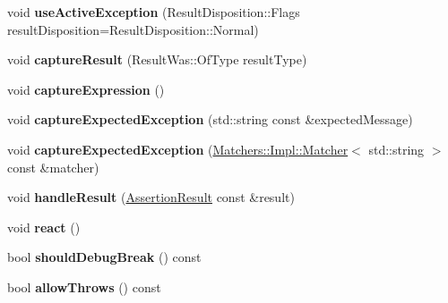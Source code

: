 \begin{DoxyCompactItemize}
\item 
void {\bfseries use\+Active\+Exception} (Result\+Disposition\+::\+Flags result\+Disposition=Result\+Disposition\+::\+Normal)\hypertarget{classCatch_1_1ResultBuilder_a5bbd2f14a678f3e8d0f791ac6d233d65}{}\label{classCatch_1_1ResultBuilder_a5bbd2f14a678f3e8d0f791ac6d233d65}

\item 
void {\bfseries capture\+Result} (Result\+Was\+::\+Of\+Type result\+Type)\hypertarget{classCatch_1_1ResultBuilder_a10e467f7b7a4976e5d148b4d5066e8fd}{}\label{classCatch_1_1ResultBuilder_a10e467f7b7a4976e5d148b4d5066e8fd}

\item 
void {\bfseries capture\+Expression} ()\hypertarget{classCatch_1_1ResultBuilder_af2ae2343965802eeeb0abbd4ea9d2d36}{}\label{classCatch_1_1ResultBuilder_af2ae2343965802eeeb0abbd4ea9d2d36}

\item 
void {\bfseries capture\+Expected\+Exception} (std\+::string const \&expected\+Message)\hypertarget{classCatch_1_1ResultBuilder_a9ac96f6220c8dd8e4feee725c6228d77}{}\label{classCatch_1_1ResultBuilder_a9ac96f6220c8dd8e4feee725c6228d77}

\item 
void {\bfseries capture\+Expected\+Exception} (\hyperlink{structCatch_1_1Matchers_1_1Impl_1_1Matcher}{Matchers\+::\+Impl\+::\+Matcher}$<$ std\+::string $>$ const \&matcher)\hypertarget{classCatch_1_1ResultBuilder_a7d443d632eaeabe2cb36218b8dcb7400}{}\label{classCatch_1_1ResultBuilder_a7d443d632eaeabe2cb36218b8dcb7400}

\item 
void {\bfseries handle\+Result} (\hyperlink{classCatch_1_1AssertionResult}{Assertion\+Result} const \&result)\hypertarget{classCatch_1_1ResultBuilder_ad8bb17e4ac590b75bf8630d8f3502f4e}{}\label{classCatch_1_1ResultBuilder_ad8bb17e4ac590b75bf8630d8f3502f4e}

\item 
void {\bfseries react} ()\hypertarget{classCatch_1_1ResultBuilder_a3085cdc46533d45bed6f652a2ac295c0}{}\label{classCatch_1_1ResultBuilder_a3085cdc46533d45bed6f652a2ac295c0}

\item 
bool {\bfseries should\+Debug\+Break} () const \hypertarget{classCatch_1_1ResultBuilder_a34cdbf7ad1e5b3cb4a94047f2d14bcb2}{}\label{classCatch_1_1ResultBuilder_a34cdbf7ad1e5b3cb4a94047f2d14bcb2}

\item 
bool {\bfseries allow\+Throws} () const \hypertarget{classCatch_1_1ResultBuilder_a3dbf18a3a4b00173dab052a8864e435e}{}\label{classCatch_1_1ResultBuilder_a3dbf18a3a4b00173dab052a8864e435e}

\end{DoxyCompactItemize}
